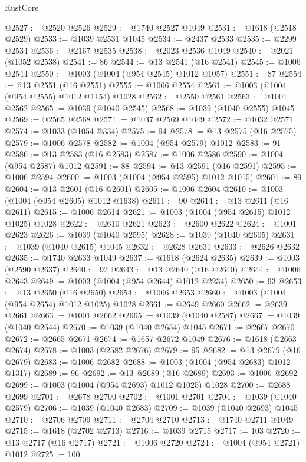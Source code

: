 \begin{lexlean}{RustCore}
\begin{coremodule}
@2527 := @2520 @2526
@2529 := @1740 @2527 @1049
@2531 := @1618 (@2518 @2529)
@2533 := @1039 @2531 @1045
@2534 := @2437 @2533
@2535 := @2299 @2534
@2536 := @2167 @2535
@2538 := @2023 @2536 @1049
@2540 := @2021 (@1052 @2538)
@2541 := 86
@2544 := @13 @2541 (@16 @2541)
@2545 := @1006 @2544
@2550 := @1003 (@1004 (@954 @2545) @1012 @1057)
@2551 := 87
@2554 := @13 @2551 (@16 @2551)
@2555 := @1006 @2554
@2561 := @1003 (@1004 (@954 @2555) @1012 @1154) @1028
@2562 := @2550 @2561
@2563 := @1001 @2562
@2565 := @1039 (@1040 @2545)
@2568 := @1039 (@1040 @2555) @1045
@2569 := @2565 @2568
@2571 := @1037 @2569 @1049
@2572 := @1032 @2571
@2574 := @1033 (@1054 @334)
@2575 := 94
@2578 := @13 @2575 (@16 @2575)
@2579 := @1006 @2578
@2582 := @1004 (@954 @2579) @1012
@2583 := 91
@2586 := @13 @2583 (@16 @2583)
@2587 := @1006 @2586
@2590 := @1004 (@954 @2587) @1012
@2591 := 88
@2594 := @13 @2591 (@16 @2591)
@2595 := @1006 @2594
@2600 := @1003 (@1004 (@954 @2595) @1012 @1015)
@2601 := 89
@2604 := @13 @2601 (@16 @2601)
@2605 := @1006 @2604
@2610 := @1003 (@1004 (@954 @2605) @1012 @1638)
@2611 := 90
@2614 := @13 @2611 (@16 @2611)
@2615 := @1006 @2614
@2621 := @1003 (@1004 (@954 @2615) @1012 @1025) @1028
@2622 := @2610 @2621
@2623 := @2600 @2622
@2624 := @1001 @2623
@2626 := @1039 (@1040 @2595)
@2628 := @1039 (@1040 @2605)
@2631 := @1039 (@1040 @2615) @1045
@2632 := @2628 @2631
@2633 := @2626 @2632
@2635 := @1740 @2633 @1049
@2637 := @1618 (@2624 @2635)
@2639 := @1003 (@2590 @2637)
@2640 := 92
@2643 := @13 @2640 (@16 @2640)
@2644 := @1006 @2643
@2649 := @1003 (@1004 (@954 @2644) @1012 @2234)
@2650 := 93
@2653 := @13 @2650 (@16 @2650)
@2654 := @1006 @2653
@2660 := @1003 (@1004 (@954 @2654) @1012 @1025) @1028
@2661 := @2649 @2660
@2662 := @2639 @2661
@2663 := @1001 @2662
@2665 := @1039 (@1040 @2587)
@2667 := @1039 (@1040 @2644)
@2670 := @1039 (@1040 @2654) @1045
@2671 := @2667 @2670
@2672 := @2665 @2671
@2674 := @1657 @2672 @1049
@2676 := @1618 (@2663 @2674)
@2678 := @1003 (@2582 @2676)
@2679 := 95
@2682 := @13 @2679 (@16 @2679)
@2683 := @1006 @2682
@2688 := @1003 (@1004 (@954 @2683) @1012 @1317)
@2689 := 96
@2692 := @13 @2689 (@16 @2689)
@2693 := @1006 @2692
@2699 := @1003 (@1004 (@954 @2693) @1012 @1025) @1028
@2700 := @2688 @2699
@2701 := @2678 @2700
@2702 := @1001 @2701
@2704 := @1039 (@1040 @2579)
@2706 := @1039 (@1040 @2683)
@2709 := @1039 (@1040 @2693) @1045
@2710 := @2706 @2709
@2711 := @2704 @2710
@2713 := @1740 @2711 @1049
@2715 := @1618 (@2702 @2713)
@2716 := @1039 @2715
@2717 := 103
@2720 := @13 @2717 (@16 @2717)
@2721 := @1006 @2720
@2724 := @1004 (@954 @2721) @1012
@2725 := 100

\end{coremodule}
\end{lexlean}
